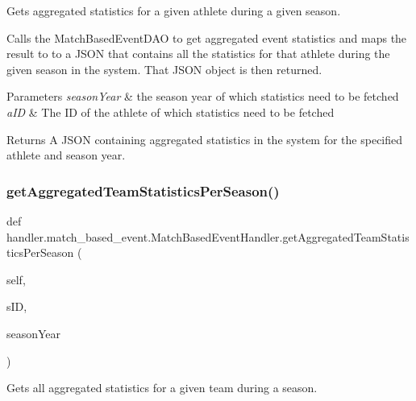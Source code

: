 Gets aggregated statistics for a given athlete during a given season. 

Calls the Match\+Based\+Event\+D\+AO to get aggregated event statistics and maps the result to to a J\+S\+ON that contains all the statistics for that athlete during the given season in the system. That J\+S\+ON object is then returned.


\begin{DoxyParams}{Parameters}
{\em season\+Year} & the season year of which statistics need to be fetched \\
\hline
{\em a\+ID} & The ID of the athlete of which statistics need to be fetched\\
\hline
\end{DoxyParams}
\begin{DoxyReturn}{Returns}
A J\+S\+ON containing aggregated statistics in the system for the specified athlete and season year. 
\end{DoxyReturn}
\mbox{\label{classhandler_1_1match__based__event_1_1_match_based_event_handler_a7c0283d57489e62153e13277594ff859}} 
\subsubsection{\texorpdfstring{get\+Aggregated\+Team\+Statistics\+Per\+Season()}{getAggregatedTeamStatisticsPerSeason()}}
{\footnotesize\ttfamily def handler.\+match\+\_\+based\+\_\+event.\+Match\+Based\+Event\+Handler.\+get\+Aggregated\+Team\+Statistics\+Per\+Season (\begin{DoxyParamCaption}\item[{}]{self,  }\item[{}]{s\+ID,  }\item[{}]{season\+Year }\end{DoxyParamCaption})}



Gets all aggregated statistics for a given team during a season. 

